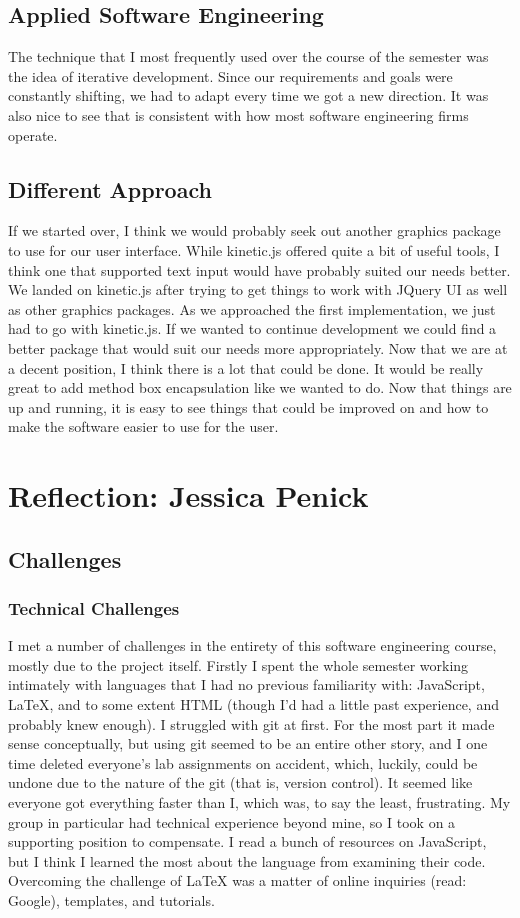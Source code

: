 \documentclass[a4paper]{article}
\begin{document}
\subsection{Applied Software Engineering}
The technique that I most frequently used over the course of the semester was the idea of iterative development. Since our requirements and goals were constantly shifting, we had to adapt every time we got a new direction. It was also nice to see that is consistent with how most software engineering firms operate.   

\subsection{Different Approach}
If we started over, I think we would probably seek out another graphics package to use for our user interface. While kinetic.js offered quite a bit of useful tools, I think one that supported text input would have probably suited our needs better. We landed on kinetic.js after trying to get things to work with JQuery UI as well as other graphics packages. As we approached the first implementation, we just had to go with kinetic.js. If we wanted to continue development we could find a better package that would suit our needs more appropriately. Now that we are at a decent position, I think there is a lot that could be done. It would be really great to add method box encapsulation like we wanted to do. Now that things are up and running, it is easy to see things that could be improved on and how to make the software easier to use for the user. 


\section{Reflection: Jessica Penick}
\subsection{Challenges}
\subsubsection{Technical Challenges}
I met a number of challenges in the entirety of this software engineering course, mostly due to the project itself. Firstly I spent the whole semester working intimately with languages that I had no previous familiarity with: JavaScript, LaTeX, and to some extent HTML (though I'd had a little past experience, and probably knew enough). I struggled with git at first. For the most part it made sense conceptually, but using git seemed to be an entire other story, and I one time deleted everyone's lab assignments on accident, which, luckily, could be undone due to the nature of the git (that is, version control). It seemed like everyone got everything faster than I, which was, to say the least, frustrating. My group in particular had technical experience beyond mine, so I took on a supporting position to compensate. I read a bunch of resources on JavaScript, but I think I learned the most about the language from examining their code. Overcoming the challenge of LaTeX was a matter of online inquiries (read: Google), templates, and tutorials.
\end{document}
